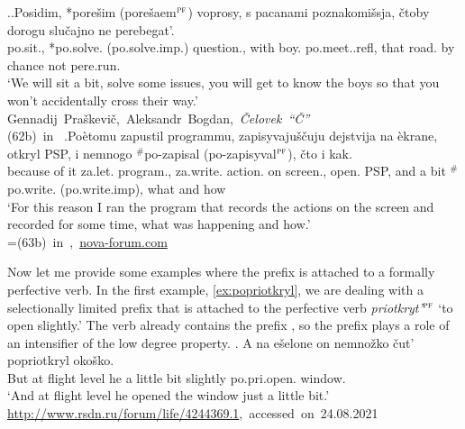 \ex.\label{ex:po:Tat}\ag.\label{ex:po:Tat1}Posidim, *pore\v{s}im (\textsuperscript{\JudgeOK}pore\v{s}aem$^{\textsc{pf}}$) voprosy, s pacanami poznakomi\v{s}sja, \v{c}toby dorogu slu\v{c}ajno ne perebegat'.\\
po.sit., *po.solve. (\textsuperscript{\JudgeOK}po.solve.imp.) question., with boy. po.meet..refl, that road. {by chance} not pere.run.\\
\trans `We will sit a bit, solve some issues, you will get to know the boys so that you won't accidentally cross their way.'\\\hbox{}\hfill\hbox{Gennadij Pra\v{s}kevi\v{c}, Aleksandr Bogdan, \textit{\v{C}elovek ``\v{C}''}}\\\hbox{}\hfill\hbox{(62b) in \citet{Tatevosov:09}}
\bg.\label{ex:po:Tat2}Po\`{e}tomu zapustil programmu, zapisyvaju\v{s}\v{c}uju dejstvija na \`{e}krane, otkryl PSP, i nemnogo $^\#$po-zapisal (\textsuperscript{\JudgeOK}po-zapisyval$^{\textsc{pf}}$), \v{c}to i kak.\\
{because of it} za.let. program., za.write. action. on screen., open. PSP, and {a bit} $^\#$po.write. (\textsuperscript{\JudgeOK}po.write.imp), what and how\\
\trans `For this reason I ran the program that records the actions on the screen and recorded for some time, what was happening and how.'\\\hbox{}\hfill\hbox{=(63b) in \citet{Tatevosov:09}, \url{nova-forum.com}}

Now let me provide some examples where the  prefix  is attached to a formally perfective verb. In the first example, \ref{ex:popriotkryl}, we are dealing with a selectionally limited prefix  that is attached to the perfective verb \textit{priotkryt'}$^{\textsc{pf}}$ `to open slightly.' The  verb already contains the  prefix , so the  prefix  plays a role of an intensifier of the low degree property. 
\exg. \label{ex:popriotkryl}A na e\v{s}elone on nemno\v{z}ko \v{c}ut' popriotkryl oko\v{s}ko.\\
But at {flight level} he {a little bit} {slightly} po.pri.open. window.\\
\trans `And at flight level he opened the window just a little bit.'\\\hbox{}\hfill\hbox{\url{http://www.rsdn.ru/forum/life/4244369.1}, accessed on 24.08.2021}


